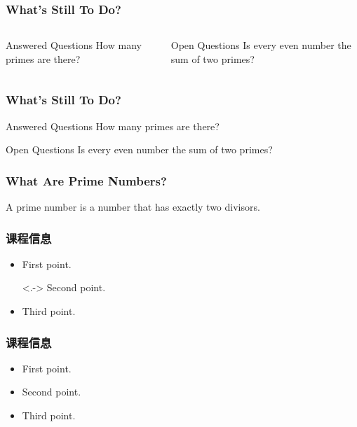 \begin{frame}
	\frametitle{What's Still To Do?}
	\begin{columns}
\begin{block}{Answered Questions}
	How many primes are there?
\end{block}
\begin{block}{Open Questions}
	Is every even number the sum of two primes?
\end{block}
\end{columns}
\end{frame}



\begin{frame}
	\frametitle{What's Still To Do?}
	\begin{block}{Answered Questions}
		How many primes are there?
	\end{block}
	\begin{block}{Open Questions}
		Is every even number the sum of two primes?
	\end{block}
\end{frame}


\begin{frame}
	\frametitle{What Are Prime Numbers?}
	\begin{definition}
		A \alert{prime number} is a number that has exactly two divisors.
	\end{definition}
\end{frame}



\begin{frame}
	\frametitle{课程信息}
	
	\begin{itemize}[<+->]
		\item First point.
		\item[<.->] Second point.
		\item Third point.
	\end{itemize}
	
	
	
\end{frame}

\begin{frame}
	\frametitle{课程信息}
	
\begin{itemize}
	\item<1-| alert@1> First point.
	\item<2-| alert@2> Second point.
	\item<3-| alert@3> Third point.
\end{itemize}
	
	
\end{frame}


